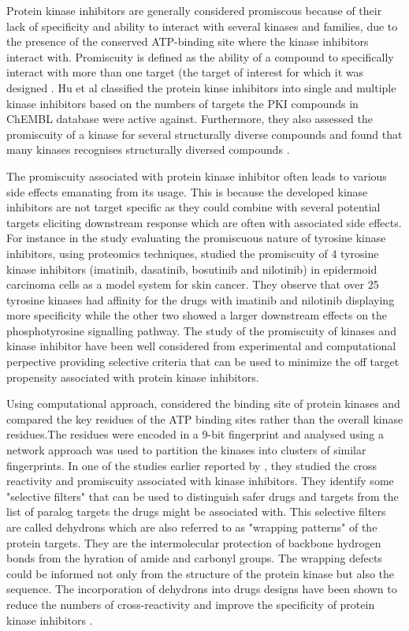 \documentclass[a4paper, 11pt]{article}
\begin{document}
Protein kinase inhibitors are generally considered promiscous because of their lack of specificity and ability to interact with several kinases and families, due to the presence of the conserved ATP-binding site where the kinase inhibitors interact with. Promiscuity is defined as the ability of a compound to specifically interact with more than one target (the target of interest for which it was designed \cite{hu2017mapping}. Hu et al classified the protein kinse inhibitors into single and multiple kinase inhibitors based on the numbers of targets the PKI compounds in ChEMBL database were active against. Furthermore, they also assessed the promiscuity of a kinase for several structurally diverse compounds and found that many kinases recognises structurally diversed compounds \cite{hu2017mapping}.\par
The promiscuity associated with protein kinase inhibitor often leads to various side effects emanating from its usage. This is because the developed kinase inhibitors are not target specific as they could combine with several potential targets eliciting downstream response which are often with associated side effects. For instance in the study evaluating the promiscuous nature of tyrosine kinase inhibitors, \cite{giansanti2014evaluating} using proteomics techniques, studied the promiscuity of 4 tyrosine kinase inhibitors (imatinib, dasatinib, bosutinib and nilotinib) in epidermoid carcinoma cells as a model system for skin cancer. They observe that over 25 tyrosine kinases had affinity for the drugs with imatinib and nilotinib displaying more specificity while the other two showed a larger downstream effects on the phosphotyrosine signalling pathway. The study  of the promiscuity of kinases and kinase inhibitor have been well considered from experimental and computational perpective providing selective criteria that can be used to minimize the off target propensity associated with protein kinase inhibitors.\par
Using computational approach, \cite{huang2009kinase} considered the binding site of protein kinases and compared the key residues of the ATP binding sites rather than the overall kinase residues.The residues were encoded in a 9-bit fingerprint and analysed using a network approach was used to partition the kinases into clusters of similar fingerprints. In one of the studies earlier reported by \cite{zhang2008turning}, they studied the cross reactivity and promiscuity associated with kinase inhibitors. They identify some "selective filters" that can be used to distinguish safer drugs and targets from the list of paralog targets the drugs might be associated with. This selective filters are called dehydrons which are also referred to as "wrapping patterns" of the protein targets. They are the intermolecular protection of backbone hydrogen bonds from the hyration of amide and carbonyl groups. The wrapping defects could be informed not only from the structure of the protein kinase but also the sequence. The incorporation of dehydrons into drugs designs have been shown to reduce the numbers of cross-reactivity and improve the specificity of protein kinase inhibitors \cite{zhang2008turning}.\par
\end{document}

